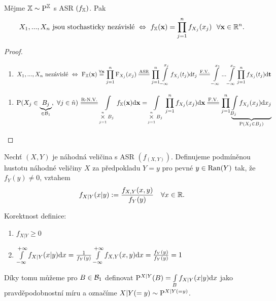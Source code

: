 \begin{theorem}
	Mějme $\mathbb{X}\sim\mathrm{P}^{\mathbb{X}}$ s ASR $(f_{\mathbb{X}})$. Pak
	$$X_1,... ,X_n\text{ jsou stochasticky nezávislé}~\Leftrightarrow ~f_{\mathbb{X}}(\textbf{x})=\prod\limits_{j=1}^n f_{X_j}(x_j)~~\forall \textbf{x}\in\mathbb{R}^n.$$
	\begin{proof}
		\begin{enumerate}[$\Rightarrow$:]
			\item $$X_1,... ,X_n\text{ nezávislé}~\Leftrightarrow ~\FEX(\textbf{x})\stackrel{\forall \textbf{x}}{=}\prod\limits_{j=1}^n \FF_{X_j}(x_j)\equal{\text{ASR}}\prod\limits_{j=1}^n \int\limits_{-\infty}^{x_j} f_{X_j}(t_j)\dif t_j\equal{\text{F.V.}}\int\limits_{-\infty}^{x_1}... \int\limits_{-\infty}^{x_n}\prod\limits_{j=1}^n f_{X_j}(t_j)\dif\textbf{t}$$
		\end{enumerate}
	\begin{enumerate}[$\Leftarrow$:]
	\item $$\PP(X_j\in \underbrace{B_j}_{\in\Bb_1},~ \forall j \in \hat{n})\equal{\text{R-N.V.}}\int\limits_{\bigtimes\limits_{j=1}^n B_j} \fex(\textbf{x})\dif\textbf{x}=\int\limits_{\bigtimes\limits_{j=1}^n B_j} \prod\limits_{j=1}^n f_{X_j}(x_j)\dif\textbf{x}\equal{\text{F.V.}}\prod\limits_{j=1}^n \underbrace{\int\limits_{B_j}f_{X_j}(x_j)\dif x_j}_{\PP(X_j\in B_j)} $$
\end{enumerate}
	\end{proof} 
\end{theorem}
\begin{define}
	Nechť $(X,Y)$ je náhodná veličina s ASR $(f_{(X,Y)})$. Definujeme podmíněnou hustotu náhodné veličiny $X$ za předpokladu $Y=y$ pro pevné $y\in\mathop{\mathrm{Ran}}(Y)$ tak, že $f_Y(y)\neq 0$, vztahem
	$$f_{X|Y}(x|y):=\frac{f_{X,Y}(x,y)}{f_Y(y)} ~~~\forall x\in\mathbb{R}.$$
\end{define}
\begin{remark}
	Korektnost definice:
	\begin{enumerate}
		\item $f_{X|Y}\geq 0$
		\item $\int\limits_{-\infty}^{+\infty}f_{X|Y}(x|y)\mathrm{d} x=\frac{1}{f_Y(y)}\int\limits_{-\infty}^{+\infty}f_{X,Y}(x,y)\mathrm{d} x=\frac{f_Y(y)}{f_Y(y)}=1$
	\end{enumerate}
Díky tomu můžeme pro $B\in\mathcal{B}_1$ definovat $\mathrm{P}^{X|Y}(B)=\int\limits_{B} f_{X|Y}(x|y)\mathrm{d} x$ jako pravděpodobnostní míru a označíme $X|Y(=y)\sim \mathrm{P}^{X|Y(=y)}$.
\end{remark}
